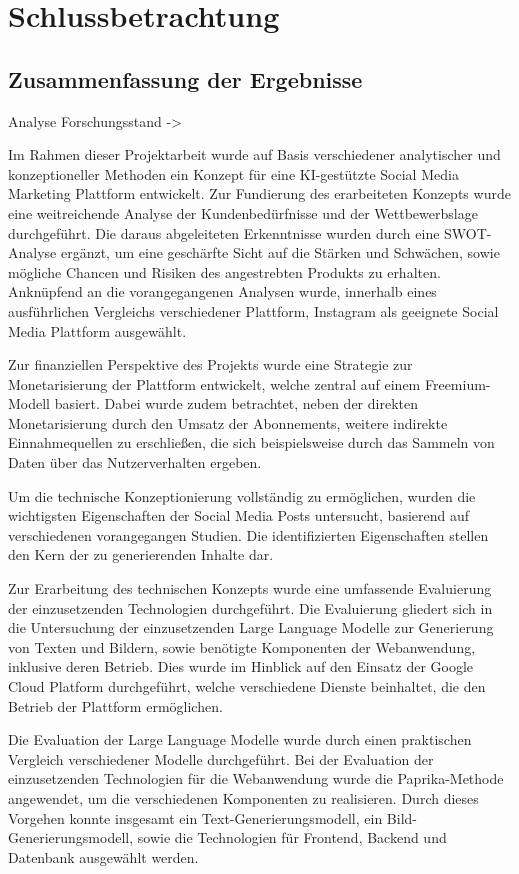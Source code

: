 \newpage
\section{Schlussbetrachtung}

\subsection{Zusammenfassung der Ergebnisse}

Analyse Forschungsstand
->

Im Rahmen dieser Projektarbeit wurde auf Basis verschiedener analytischer und konzeptioneller Methoden ein Konzept für eine KI-gestützte Social Media Marketing Plattform entwickelt.
Zur Fundierung des erarbeiteten Konzepts wurde eine weitreichende Analyse der Kundenbedürfnisse und der Wettbewerbslage durchgeführt.
Die daraus abgeleiteten Erkenntnisse wurden durch eine SWOT-Analyse ergänzt, um eine geschärfte Sicht auf die Stärken und Schwächen, sowie mögliche Chancen und Risiken des angestrebten Produkts zu erhalten.
Anknüpfend an die vorangegangenen Analysen wurde, innerhalb eines ausführlichen Vergleichs verschiedener Plattform, Instagram als geeignete Social Media Plattform ausgewählt.

Zur finanziellen Perspektive des Projekts wurde eine Strategie zur Monetarisierung der Plattform entwickelt, welche zentral auf einem Freemium-Modell basiert.
Dabei wurde zudem betrachtet, neben der direkten Monetarisierung durch den Umsatz der Abonnements, weitere indirekte Einnahmequellen zu erschließen, die sich beispielsweise durch das Sammeln von Daten über das Nutzerverhalten ergeben.

Um die technische Konzeptionierung vollständig zu ermöglichen, wurden die wichtigsten Eigenschaften der Social Media Posts untersucht, basierend auf verschiedenen vorangegangen Studien.
Die identifizierten Eigenschaften stellen den Kern der zu generierenden Inhalte dar.

Zur Erarbeitung des technischen Konzepts wurde eine umfassende Evaluierung der einzusetzenden Technologien durchgeführt.
Die Evaluierung gliedert sich in die Untersuchung der einzusetzenden Large Language Modelle zur Generierung von Texten und Bildern, sowie benötigte Komponenten der Webanwendung, inklusive deren Betrieb.
Dies wurde im Hinblick auf den Einsatz der Google Cloud Platform durchgeführt, welche verschiedene Dienste beinhaltet, die den Betrieb der Plattform ermöglichen.

Die Evaluation der Large Language Modelle wurde durch einen praktischen Vergleich verschiedener Modelle durchgeführt.
Bei der Evaluation der einzusetzenden Technologien für die Webanwendung wurde die Paprika-Methode angewendet, um die verschiedenen Komponenten zu realisieren.
Durch dieses Vorgehen konnte insgesamt ein Text-Generierungsmodell, ein Bild-Generierungsmodell, sowie die Technologien für Frontend, Backend und Datenbank ausgewählt werden.

